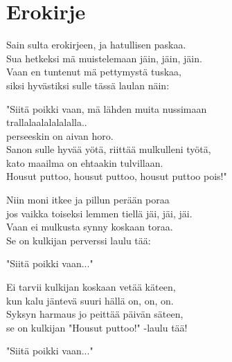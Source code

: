 \section{Erokirje}
Sain sulta erokirjeen, ja hatullisen paskaa.\\
Sua hetkeksi mä muistelemaan jäin, jäin, jäin.\\
Vaan en tuntenut mä pettymystä tuskaa,\\
siksi hyvästiksi sulle tässä laulan näin:

"Siitä poikki vaan, mä lähden muita nussimaan\\
trallalaalalalalalla..\\
perseeskin on aivan horo.\\
Sanon sulle hyvää yötä, riittää mulkulleni työtä,\\
kato maailma on ehtaakin tulvillaan.\\
Housut puttoo, housut puttoo, housut puttoo pois!"

Niin moni itkee ja pillun perään poraa\\
jos vaikka toiseksi lemmen tiellä jäi, jäi, jäi.\\
Vaan ei mulkusta synny koskaan toraa.\\
Se on kulkijan perverssi laulu tää:

"Siitä poikki vaan..."

Ei tarvii kulkijan koskaan vetää käteen,\\
kun kalu jäntevä suuri hällä on, on, on.\\
Syksyn harmaus jo peittää päivän säteen,\\
se on kulkijan "Housut puttoo!" -laulu tää!

"Siitä poikki vaan..."